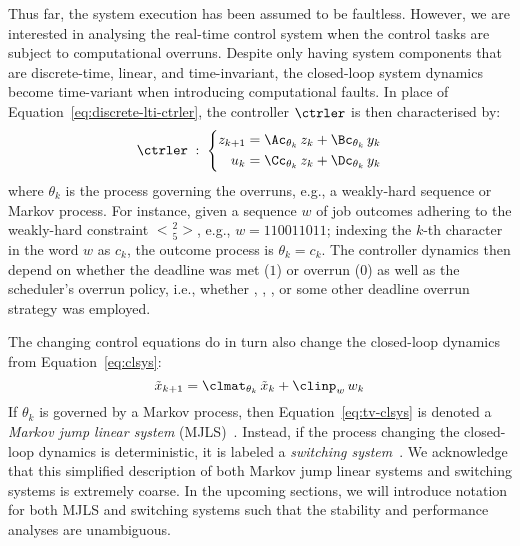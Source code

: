 Thus far, the system execution has been assumed to be faultless.
However, we are interested in analysing the real-time control system when the control tasks are subject to computational overruns.
Despite only having system components that are discrete-time, linear, and time-invariant, the closed-loop system dynamics become time-variant when introducing computational faults.
In place of Equation~\eqref{eq:discrete-lti-ctrler}, the controller $\ctrler$ is then characterised by:
%
\begin{equation}%
    \label{eq:tv-ctrler}%
    \ctrler \; : \; \left\{\begin{aligned}
        z_{k+1} &= \Ac_{\theta_k}\,z_k + \Bc_{\theta_k}\,y_k \\
        u_k &= \Cc_{\theta_k}\,z_k + \Dc_{\theta_k}\,y_k \\
    \end{aligned}\right.
\end{equation}
%
where $\theta_k$ is the process governing the overruns, e.g., a weakly-hard sequence or Markov process.
For instance, given a sequence $w$ of job outcomes adhering to the weakly-hard \tRH{} constraint $\genfrac{<}{>}{0pt}{}{2}{5}$, e.g., $w = 110011011$; indexing the $k$-th character in the word $w$ as $c_k$, the outcome process is $\theta_k = c_k$.
The controller dynamics then depend on whether the deadline was met ($1$) or overrun ($0$) as well as the scheduler's overrun policy, i.e., whether \tK{}, \tS{}, \tQ{}, or some other deadline overrun strategy was employed.

The changing control equations do in turn also change the closed-loop dynamics from Equation~\eqref{eq:clsys}:
%
\begin{equation}%
    \label{eq:tv-clsys}%
    \tilde{x}_{k+1} = \clmat_{\theta_k}\, \tilde{x}_k + \clinp_w\, w_k
\end{equation}
%
If $\theta_k$ is governed by a Markov process, then Equation~\eqref{eq:tv-clsys} is denoted a \emph{Markov jump linear system} (MJLS)~\cite{Feng:1992}.
Instead, if the process changing the closed-loop dynamics is deterministic, it is labeled a \emph{switching system}~\cite{Liberzon:2003}.
We acknowledge that this simplified description of both Markov jump linear systems and switching systems is extremely coarse.
In the upcoming sections, we will introduce notation for both MJLS and switching systems such that the stability and performance analyses are unambiguous.



